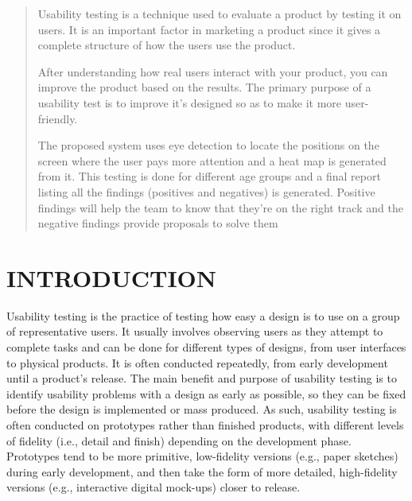 \documentclass[12pt,a4paper,final]{extreport}
\begin{document}
\begin{quote}
    Usability testing is a technique used to evaluate a product by testing it on users. It is an important factor in marketing a product since it gives a complete structure of how the users use the product.

    After understanding how real users interact with your product, you can improve the product based on the results. The primary purpose of a usability test is to improve it’s designed so as to make it more user-friendly.
    
    The proposed system uses eye detection to locate the positions on the screen where the user pays more attention and a heat map is generated from it. This testing is done for different age groups and a final report listing all the findings (positives and negatives) is generated. Positive findings will help the team to know that they’re on the right track and the negative findings provide proposals to solve them
    


\end{quote}

\newpage
\tableofcontents
{}


\newpage
\listoffigures 
{}

\clearpage
{}
\chead{}
\rhead{}
\cfoot{}
\rfoot{\thepage}
\renewcommand{\headrulewidth}{0.4pt}
\renewcommand{\footrulewidth}{0.4pt}
\pagestyle{fancy}



\chapter{INTRODUCTION}
\vspace{0.3cm}
\noindent
Usability testing is the practice of testing how easy a design is to use on a group of representative users. It usually involves observing users as they attempt to complete tasks and can be done for different types of designs, from user interfaces to physical products. It is often conducted repeatedly, from early development until a product’s release. The main benefit and purpose of usability testing is to identify usability problems with a design as early as possible, so they can be fixed before the design is implemented or mass produced. As such, usability testing is often conducted on prototypes rather than finished products, with different levels of fidelity (i.e., detail and finish) depending on the development phase. Prototypes tend to be more primitive, low-fidelity versions (e.g., paper sketches) during early development, and then take the form of more detailed, high-fidelity versions (e.g., interactive digital mock-ups) closer to release.
\end{document}
